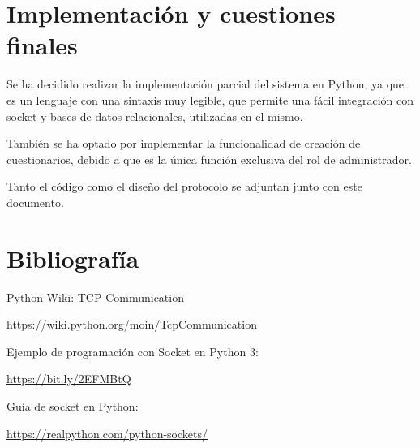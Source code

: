 \documentclass[11pt,a4paper]{article}
\begin{document}
\section{Implementación y cuestiones finales}
Se ha decidido realizar la implementación parcial del sistema en Python, ya que es un lenguaje con una sintaxis muy legible, que permite una fácil integración con socket y bases de datos relacionales, utilizadas en el mismo.

\medskip

También se ha optado por implementar la funcionalidad de creación de cuestionarios, debido a que es la única función exclusiva del rol de administrador.

\medskip

Tanto el código como el diseño del protocolo se adjuntan junto con este documento.

\section{Bibliografía}
Python Wiki: TCP Communication

\url{https://wiki.python.org/moin/TcpCommunication}

\medskip

Ejemplo de programación con Socket en Python 3:

\url{https://bit.ly/2EFMBtQ}

\medskip

Guía de socket en Python:

\url{https://realpython.com/python-sockets/}
\end{document}
